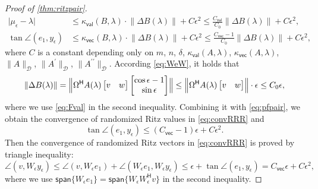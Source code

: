 \documentclass[a4paper,11pt]{article}
\newcommand{\Htran}{\mathsf{H}}
\newcommand{\region}{\mathcal{D}}
\newcommand{\Crval}{C_{\mathsf{val}}}
\newcommand{\Crvec}{C_{\mathsf{vec}}}
\newcommand{\kval}{\kappa_{\mathsf{val}}}
\newcommand{\kvec}{\kappa_{\mathsf{vec}}}
\providecommand{\spa}[1]{\mathsf{span}\{#1\}}
\providecommand{\abs}[1]{\lvert#1\rvert}
\providecommand{\norm}[1]{\lVert#1\rVert}
\providecommand{\Bignorm}[1]{\Bigl\lVert#1\Bigr\rVert}
\begin{document}
\begin{proof}[Proof of \cref{thm:ritzpair}]
    \begin{equation}
        \label{eq:pfpair}
        \begin{aligned}
            \abs{\mu_{\epsilon}-\lambda} &\leq \kval(B,\lambda)\cdot\norm{\Delta B(\lambda)} +C\epsilon^{2}\leq \frac{\Crval}{C_{0}}\norm{\Delta B(\lambda)} +C\epsilon^{2},\\ 
            \tan\angle(e_{1},y_{\epsilon})&\leq \kvec(B,\lambda)\cdot\norm{\Delta B(\lambda)} +C\epsilon^{2} \leq \frac{\Crvec-1}{C_{0}}\norm{\Delta B(\lambda)} +C\epsilon^{2},
        \end{aligned}
    \end{equation}
    where $C$ is a constant depending only on $m$, $n$, $\delta$, $\kval(A,\lambda)$, $\kvec(A,\lambda)$, $\norm{A}_{\region}$, $\norm{A^{\prime}}_{\region}$, $\norm{A^{\prime\prime}}_{\region}$.
    According \cref{eq:WeW}, it holds that 
    \begin{equation*}
        \norm{\Delta B(\lambda)}  
        =\Bignorm{\Omega^{\Htran}A(\lambda)\begin{bmatrix}
            v & w
        \end{bmatrix}
        \begin{bmatrix}
            \cos\epsilon-1\\ 
            \sin\epsilon
        \end{bmatrix}}\leq \Bignorm{\Omega^{\Htran}A(\lambda)\begin{bmatrix}
            v & w
        \end{bmatrix}} \cdot\epsilon \leq C_{0}\epsilon,
    \end{equation*}
    where we use \cref{eq:Fval} in the second inequality.
    Combining it with \cref{eq:pfpair}, we obtain the convergence of randomized Ritz values in \cref{eq:convRRR} and 
    \begin{equation*}
        \tan\angle(e_{1},y_{\epsilon})\leq (\Crvec-1)\epsilon +C\epsilon^{2}.
    \end{equation*}
    Then the convergence of randomized Ritz vectors in \cref{eq:convRRR} is proved by triangle inequality:
    \begin{equation}
        \angle(v,W_{\epsilon}y_{\epsilon})\leq 
        \angle(v,W_{\epsilon}e_{1})+\angle(W_{\epsilon}e_{1},W_{\epsilon}y_{\epsilon}) \leq \epsilon+\tan\angle(e_{1},y_{\epsilon}) = \Crvec\epsilon+C\epsilon^{2},
    \end{equation}
    where we use $\spa{W_{\epsilon}e_{1}}=\spa{W_{\epsilon}W_{\epsilon}^{\Htran}v}$ in the second inequality.
\end{proof}
\end{document}

